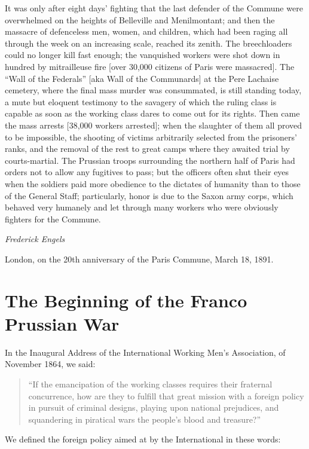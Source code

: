 \documentclass{book}
\begin{document}
It was only after eight days’ fighting that the last defender of the
Commune were overwhelmed on the heights of Belleville and Menilmontant;
and then the massacre of defenceless men, women, and children, which had
been raging all through the week on an increasing scale, reached its
zenith. The breechloaders could no longer kill fast enough; the vanquished
workers were shot down in hundred by mitrailleuse fire [over 30,000
citizens of Paris were massacred]. The “Wall of the Federals” [aka Wall of
the Communards] at the Pere Lachaise cemetery, where the final mass murder
was consummated, is still standing today, a mute but eloquent testimony to
the savagery of which the ruling class is capable as soon as the working
class dares to come out for its rights. Then came the mass arrests [38,000
workers arrested]; when the slaughter of them all proved to be impossible,
the shooting of victims arbitrarily selected from the prisoners’ ranks,
and the removal of the rest to great camps where they awaited trial by
courts-martial. The Prussian troops surrounding the northern half of Paris
had orders not to allow any fugitives to pass; but the officers often shut
their eyes when the soldiers paid more obedience to the dictates of
humanity than to those of the General Staff; particularly, honor is due to
the Saxon army corps, which behaved very humanely and let through many
workers who were obviously fighters for the Commune.

\emph{Frederick Engels}

London, on the 20th anniversary of the Paris Commune, March 18, 1891.

\chapter{The Beginning of the Franco Prussian War}

In the Inaugural Address of the International Working Men’s Association,
of November 1864, we said:

\begin{quote} 

``If the emancipation of the working classes requires their fraternal
concurrence, how are they to fulfill that great mission with a foreign
policy in pursuit of criminal designs, playing upon national prejudices,
and squandering in piratical wars the people’s blood and treasure?''

\end{quote}

We defined the foreign policy aimed at by the International in these
words:
\end{document}
